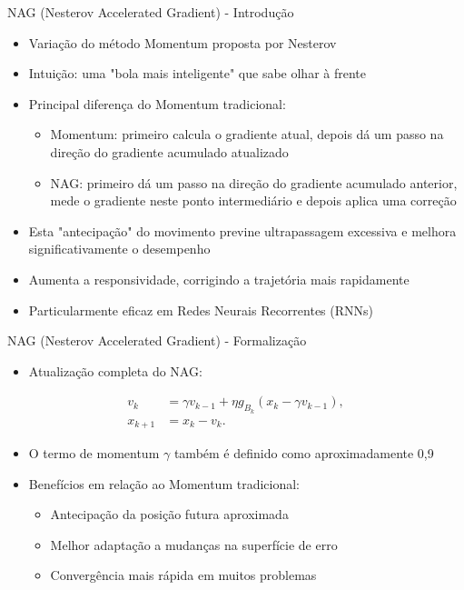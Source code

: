 \documentclass[aspectratio=1610]{beamer}
\begin{document}
\begin{frame}{NAG (Nesterov Accelerated Gradient) - Introdução}
\begin{itemize}
    \item Variação do método Momentum proposta por Nesterov
    \item Intuição: uma "bola mais inteligente" que sabe olhar à frente
    \item Principal diferença do Momentum tradicional:
    \begin{itemize}
        \item Momentum: primeiro calcula o gradiente atual, depois dá um passo na direção do gradiente acumulado atualizado
        \item NAG: primeiro dá um passo na direção do gradiente acumulado anterior, mede o gradiente neste ponto intermediário e depois aplica uma correção
    \end{itemize}
    \item Esta "antecipação" do movimento previne ultrapassagem excessiva e melhora significativamente o desempenho
    \item Aumenta a responsividade, corrigindo a trajetória mais rapidamente
    \item Particularmente eficaz em Redes Neurais Recorrentes (RNNs)
\end{itemize}
\end{frame}

\begin{frame}{NAG (Nesterov Accelerated Gradient) - Formalização}
\begin{itemize}
    \item Atualização completa do NAG:
\end{itemize}

\begin{align}
v_k &= \gamma v_{k-1} + \eta g_{B_k}(x_k - \gamma v_{k-1}), \\
x_{k+1} &= x_k - v_k.
\end{align}

\begin{itemize}
    \item O termo de momentum $\gamma$ também é definido como aproximadamente 0,9
    \item Benefícios em relação ao Momentum tradicional:
    \begin{itemize}
        \item Antecipação da posição futura aproximada
        \item Melhor adaptação a mudanças na superfície de erro
        \item Convergência mais rápida em muitos problemas
    \end{itemize}
\end{itemize}
\end{frame}
\end{document}
